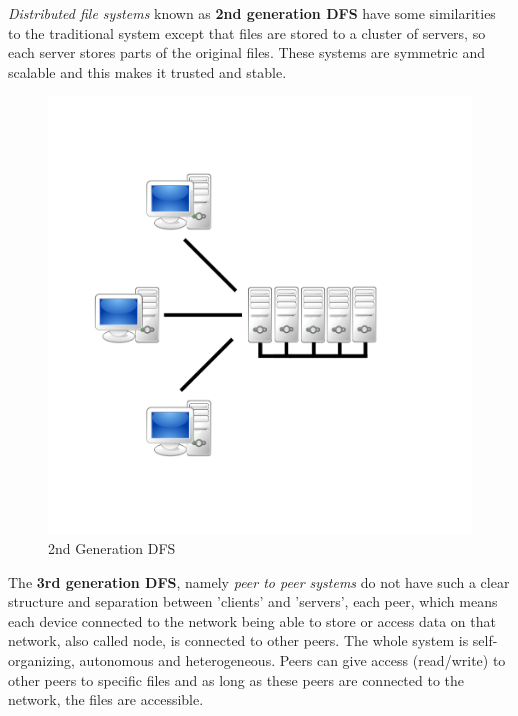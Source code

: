 \textit{Distributed file systems} known as \textbf{2nd generation DFS} have some similarities to the traditional system except that files are stored to a cluster of servers, so each server stores parts of the original files. These systems are symmetric and scalable and this makes it trusted and stable.

	\begin{figure}[H]
		\begin{center}
		\includegraphics[scale=0.2]{Talk5/2nd_gen_dfs.PNG}
		\end{center}
		\caption{2nd Generation DFS \cite{wikimedia:p2p}}
		\label{2nd_gen_dfs}
	\end{figure}
	
The \textbf{3rd generation DFS}, namely \textit{peer to peer systems} do not have such a clear structure and separation between 'clients' and 'servers', each peer, which means each device connected to the network being able to store or access data on that network, also called node, is connected to other peers. The whole system is self-organizing, autonomous and heterogeneous. Peers can give access (read/write) to other peers to specific files and as long as these peers are connected to the network, the files are accessible.
	
